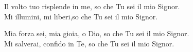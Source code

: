 
\strofa Il volto tuo risplende in me, so che Tu sei il mio Signor.\\
Mi illumini, mi liberi,so che Tu sei il mio Signor.

\spazio

 

\spazio

\strofa Mia forza sei, mia gioia, o Dio, so che Tu sei il mio Signor.\\
Mi salverai, confido in Te, so che Tu sei il mio Signor.

\spazio

 

\spazio

 